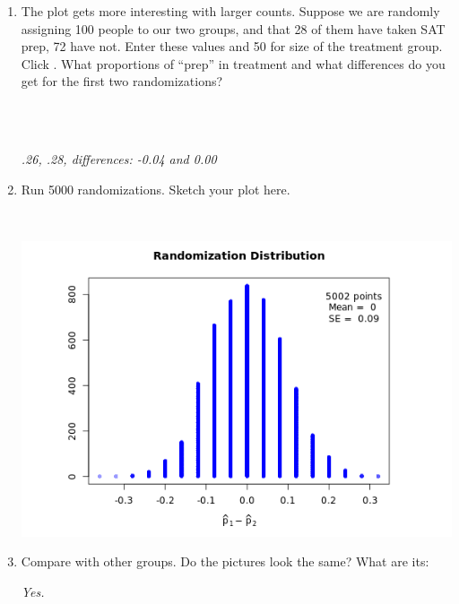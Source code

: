 \begin{enumerate}
\begin{enumerate}
\item The plot gets more interesting with larger counts. Suppose 
      we are randomly assigning 100 people to our two groups, and that
      28 of them have taken SAT prep, 72 have not. Enter these values
      and 50 for size of the treatment group. Click . 
      What proportions of ``prep'' in treatment and what differences
      do you get for the first two randomizations? 
\begin{students}
        \vspace{1cm}\\
\end{students}
\begin{key}
  \\ {\it .26, .28, differences: -0.04 and 0.00}
\end{key}
       \item Run 5000 randomizations.  Sketch your plot here.
\begin{students}
        \vspace{4cm}\\
\end{students}
\begin{key}
  
   \includegraphics[width=.4\linewidth]{../plots/SATprep-shuffles.png}
\end{key}
     \item Compare with other groups.  Do the pictures look the
       same? What are its:
\begin{key}
  {\it  Yes. }
\end{key}



\end{enumerate}
\end{enumerate}
